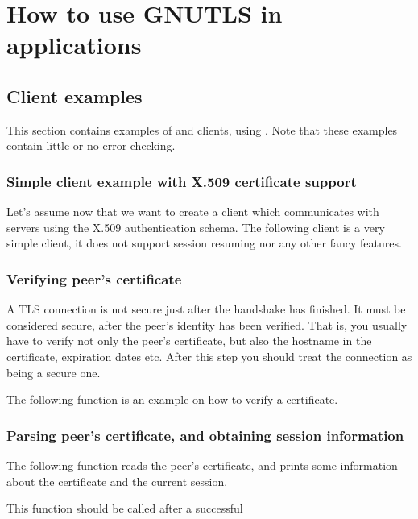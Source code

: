 \chapter{How to use GNUTLS in applications}
\label{examples}

\section{Client examples}
This section contains examples of \tls{} and \ssl{} clients, using \gnutls{}. 
Note that these examples contain little or no error checking.

\subsection{Simple client example with X.509 certificate support}
Let's assume now that we want to create a client which communicates
with servers using the X.509 authentication schema. The following client
is a very simple \tls{} client, it does not support session resuming nor
any other fancy features.


\subsection{Verifying peer's certificate}
\par A TLS connection is not secure just after the handshake has finished.
It must be considered secure, after the peer's identity has been
verified. That is, you usually have to verify not only the peer's 
certificate, but also the hostname in the certificate, expiration dates etc. 
After this step you should treat the connection as being a secure one.

\par
The following function is an example on how to verify a certificate.



\subsection{Parsing peer's certificate, and obtaining session information}
The following function reads the peer's certificate,
and prints some information about the certificate and the current session.
\par
This function should be called after a successful




